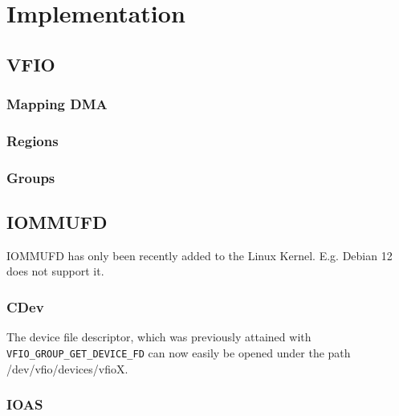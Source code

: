 \chapter{Implementation}

\section{VFIO}
\subsection{Mapping DMA}
\subsection{Regions}
\subsection{Groups}
\section{IOMMUFD}
IOMMUFD has only been recently added to the Linux Kernel. E.g. Debian 12 does not support it.
\subsection{CDev}
The device file descriptor, which was previously attained with \texttt{VFIO\_GROUP\_GET\_DEVICE\_FD} can now easily be opened under the path /dev/vfio/devices/vfioX.

\subsection{IOAS}
